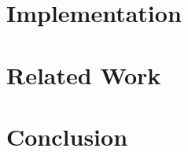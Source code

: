 \documentclass[10pt,letter,english]{article}
\begin{document}
\section{Implementation}



\section{Related Work}



\section{Conclusion}



{}

\end{document}
